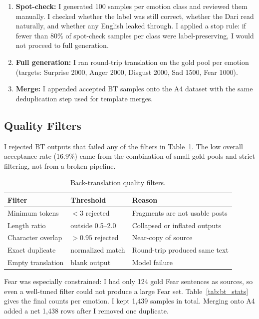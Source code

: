 \documentclass[11pt,a4paper]{article}
\begin{document}
\begin{enumerate}
    \item \textbf{Spot-check:} I generated 100 samples per emotion class and reviewed them manually. I checked whether the label was still correct, whether the Dari read naturally, and whether any English leaked through. I applied a stop rule: if fewer than 80\% of spot-check samples per class were label-preserving, I would not proceed to full generation.
    \item \textbf{Full generation:} I ran round-trip translation on the gold pool per emotion (targets: Surprise 2000, Anger 2000, Disgust 2000, Sad 1500, Fear 1000).
    \item \textbf{Merge:} I appended accepted BT samples onto the A4 dataset with the same deduplication step used for template merges.
\end{enumerate}

\subsection{Quality Filters}

I rejected BT outputs that failed any of the filters in Table~\ref{tab:bt_filters}. The low overall acceptance rate (16.9\%) came from the combination of small gold pools and strict filtering, not from a broken pipeline.

\begin{table}[H]
\centering
\caption{Back-translation quality filters.}
\label{tab:bt_filters}
\begin{tabular}{@{}lll@{}}
\toprule
Filter & Threshold & Reason \\
\midrule
Minimum tokens       & $< 3$ rejected           & Fragments are not usable posts \\
Length ratio         & outside 0.5--2.0         & Collapsed or inflated outputs \\
Character overlap    & $> 0.95$ rejected        & Near-copy of source \\
Exact duplicate      & normalized match         & Round-trip produced same text \\
Empty translation    & blank output             & Model failure \\
\bottomrule
\end{tabular}
\end{table}

Fear was especially constrained: I had only 124 gold Fear sentences as sources, so even a well-tuned filter could not produce a large Fear set. Table~\ref{tab:bt_stats} gives the final counts per emotion. I kept 1,439 samples in total. Merging onto A4 added a net 1,438 rows after I removed one duplicate.
\end{document}
